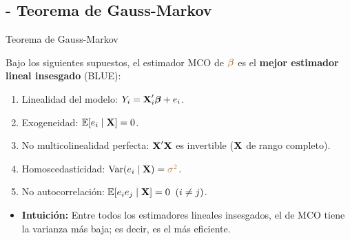 \documentclass[10pt, xcolor=dvipsnames]{beamer}
\begin{document}
\subsection{- Teorema de Gauss-Markov}

\begin{frame}{Teorema de Gauss-Markov}\label{DIAP:Gauss-Markov}
\begin{tcolorbox}[colback=white, arc=0mm,boxrule=0.5pt, title=Teorema de Gauss-Markov, breakable]	
    Bajo los siguientes supuestos, el estimador MCO de \(\textcolor{brown}{\boldsymbol{\beta}}\) es el \textbf{mejor estimador lineal insesgado} (BLUE):
    \begin{enumerate}
        \item Linealidad del modelo: \(Y_i = \textbf{X}_i'\boldsymbol{\beta} + e_i\).
        \item Exogeneidad: \(\operatorname{\mathbb{E}}[e_i \mid \textbf{X}] = 0\).
        \item No multicolinealidad perfecta: \(\textbf{X}'\textbf{X}\) es invertible (\(\textbf{X}\) de rango completo).
        \item Homoscedasticidad: \(\operatorname{Var}(e_i \mid \textbf{X}) = \textcolor{brown}{\sigma^2}\).
        \item No autocorrelación: \(\operatorname{\mathbb{E}}[e_i e_j \mid \textbf{X}] = 0 \;\; (i \neq j)\).
    \end{enumerate}    
\end{tcolorbox}
\begin{itemize}
    \item \textbf{Intuición:} Entre todos los estimadores lineales insesgados, el de MCO tiene la varianza más baja; es decir, es el más eficiente.
\end{itemize}
\end{frame}
\end{document}
